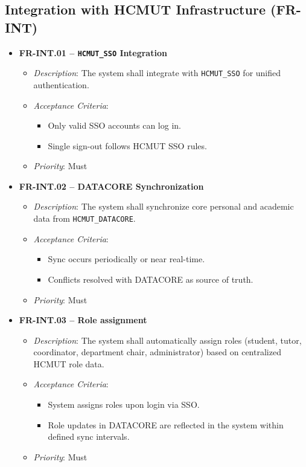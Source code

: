 \subsection{Integration with HCMUT Infrastructure (FR-INT)}

\begin{itemize}
    \item \textbf{FR-INT.01 – \texttt{HCMUT\_SSO} Integration}
        \begin{itemize}
            \item \textit{Description}: The system shall integrate with \texttt{HCMUT\_SSO} for unified authentication.
            \item \textit{Acceptance Criteria}:
                \begin{itemize}
                    \item Only valid SSO accounts can log in.
                    \item Single sign-out follows HCMUT SSO rules.
                \end{itemize}  
            \item \textit{Priority}: Must
        \end{itemize}
    \item \textbf{FR-INT.02 – DATACORE Synchronization}
        \begin{itemize}
            \item \textit{Description}: The system shall synchronize core personal and academic data from \texttt{HCMUT\_DATACORE}.
            \item \textit{Acceptance Criteria}:
                \begin{itemize}
                    \item Sync occurs periodically or near real-time.
                    \item Conflicts resolved with DATACORE as source of truth.
                \end{itemize}  
            \item \textit{Priority}: Must
        \end{itemize}

    \item \textbf{FR-INT.03 – Role assignment}
                \begin{itemize}
            \item \textit{Description}: The system shall automatically assign roles (student, tutor, coordinator, department chair, administrator) based on centralized HCMUT role data.
            \item \textit{Acceptance Criteria}:
                \begin{itemize}
                    \item System assigns roles upon login via SSO.
                    \item Role updates in DATACORE are reflected in the system within defined sync intervals.
                \end{itemize}
            \item \textit{Priority}: Must
        \end{itemize}


\end{itemize}
